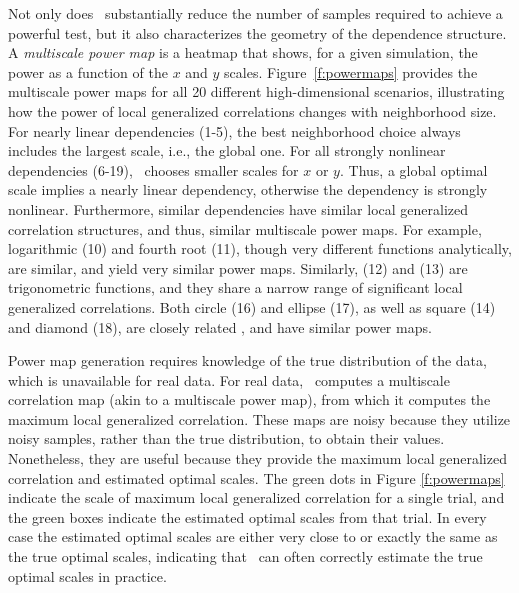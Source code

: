 \documentclass[11pt]{article}
\begin{document}
Not only does \Mgc~substantially reduce the number of samples required to achieve a powerful test, but it also  characterizes the geometry of the dependence structure. 
A \emph{multiscale power map} is a heatmap that shows, for a given simulation, the power as a function of the $x$ and $y$ scales.  
Figure~\ref{f:powermaps} provides the multiscale power maps for all 20 different high-dimensional scenarios, illustrating how the power of local generalized correlations changes with  neighborhood size.
For nearly linear dependencies (1-5), the best neighborhood choice always includes the largest scale, i.e., the global one. 
For all strongly nonlinear dependencies (6-19),  \Mgc~chooses smaller scales for $x$ or $y$. Thus, a global optimal scale implies a nearly linear dependency, otherwise the dependency is strongly nonlinear.
Furthermore, similar dependencies have similar local generalized correlation structures, and thus, similar multiscale power maps. For example, logarithmic (10) and fourth root (11), though very different functions analytically, are  similar, and yield very similar power maps.
Similarly,  (12) and (13) are trigonometric functions, and they share a narrow range of significant local generalized correlations.
Both circle (16) and ellipse (17), as well as square (14) and diamond (18), are closely related , and have similar  power maps. 

Power map generation requires knowledge of the true distribution of the data, which is unavailable for real data.
For real data, \Mgc~computes a multiscale correlation map (akin to a multiscale power map), from which it computes the maximum local generalized correlation.  These maps are noisy because they utilize noisy samples, rather than the true distribution, to obtain their values.  Nonetheless, they are useful because they provide the maximum local generalized correlation and estimated optimal scales.  The green dots in Figure \ref{f:powermaps} indicate the scale of maximum local generalized correlation for a single trial, and the green boxes indicate the estimated optimal scales from that trial.  In every case the estimated optimal scales are either very close to or exactly the same as the true optimal scales, indicating that \Mgc~can often correctly estimate the true optimal scales in practice.
\end{document}
